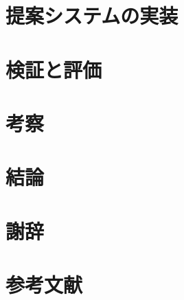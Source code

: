\documentclass[a4paper]{jreport}
\begin{document}
\chapter{提案システムの実装}

\chapter{検証と評価}

\chapter{考察}
\chapter{結論}
\chapter{謝辞}
\chapter{参考文献}
\end{document}
